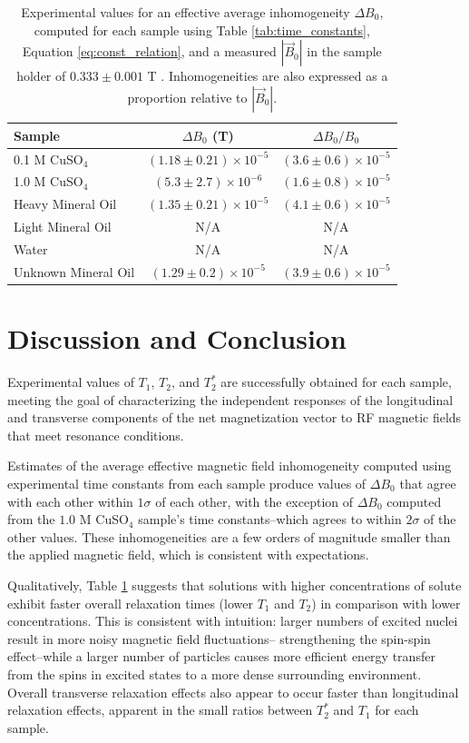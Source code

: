 \documentclass[11pt]{article}
\begin{document}
\begin{table}[H]
  \centering
  \begin{tabular}{lcc}
    \hline
    Sample & $\Delta B_0$ (T) & $\Delta B_0 / B_0$ \\
    \hline
    0.1 M CuSO$_4$ & $(1.18 \pm 0.21) \times 10^{-5}$ & $(3.6 \pm
    0.6) \times 10^{-5}$ \\
    1.0 M CuSO$_4$ & $(5.3 \pm 2.7) \times 10^{-6}$ & $(1.6 \pm 0.8)
    \times 10^{-5}$ \\
    Heavy Mineral Oil & $(1.35 \pm 0.21) \times 10^{-5}$ & $(4.1 \pm
    0.6) \times 10^{-5}$ \\
    Light Mineral Oil & N/A & N/A \\
    Water & N/A & N/A \\
    Unknown Mineral Oil & $(1.29 \pm 0.2) \times 10^{-5}$ & $(3.9
    \pm 0.6) \times 10^{-5}$ \\
    \hline
  \end{tabular}
  \caption{Experimental values for an effective average inhomogeneity
    $\Delta B_0$, computed for each sample using Table
    \ref{tab:time_constants}, Equation \ref{eq:const_relation}, and a
    measured $|\vec B_0|$ in the
    sample holder of $0.333 \pm 0.001$ T \cite{gyromag, mel}.
  Inhomogeneities are also expressed as a proportion relative to $|\vec B_0|$.}
  \label{tab:field_inhomogeneity}
\end{table}

\section{Discussion and Conclusion}

Experimental values of $T_1$, $T_2$, and $T_2^*$ are successfully obtained
for each sample, meeting the goal of characterizing the independent responses
of the longitudinal and transverse components of the net magnetization vector
to RF magnetic fields that meet resonance conditions.

Estimates of the average effective magnetic field inhomogeneity
computed using experimental time
constants from each sample produce values of $\Delta B_0$ that agree
with each other within $1 \sigma$ of each other, with the exception
of $\Delta B_0$ computed from the $1.0$ M CuSO$_4$ sample's time
constants--which agrees to within $2\sigma$ of the other values.
These inhomogeneities
are a few orders of magnitude smaller than the applied magnetic
field, which is consistent
with expectations.

Qualitatively, Table \ref{tab:field_inhomogeneity} suggests that solutions with
higher concentrations of solute exhibit faster overall relaxation
times (lower $T_1$ and $T_2$) in comparison with lower
concentrations. This is consistent
with intuition: larger numbers of excited nuclei result in more noisy
magnetic field fluctuations--
strengthening the spin-spin effect--while a larger number of
particles causes more efficient
energy transfer from the spins in excited states to a more dense
surrounding environment. Overall transverse relaxation effects also
appear to occur faster than longitudinal relaxation effects, apparent
in the small ratios between $T_2^*$ and $T_1$ for each sample.
\end{document}
